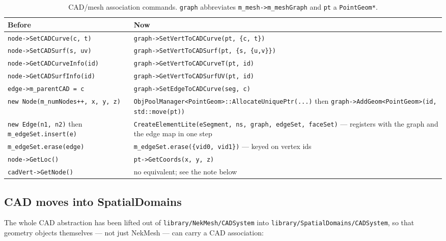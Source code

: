 \begin{table}[h!]
  \centering
  \small
  \begin{tabular}{p{}p{}}
    \hline
    \textbf{Before} & \textbf{Now}\\
    \hline
    \texttt{node->SetCADCurve(c, t)} &
    \texttt{graph->SetVertToCADCurve(pt, \{c, t\})}\\
    \hline
    \texttt{node->SetCADSurf(s, uv)} &
    \texttt{graph->SetVertToCADSurf(pt, \{s, \{u,v\}\})}\\
    \hline
    \texttt{node->GetCADCurveInfo(id)} &
    \texttt{graph->GetVertToCADCurveT(pt, id)}\\
    \hline
    \texttt{node->GetCADSurfInfo(id)} &
    \texttt{graph->GetVertToCADSurfUV(pt, id)}\\
    \hline
    \texttt{edge->m\_parentCAD = c} &
    \texttt{graph->SetEdgeToCADCurve(seg, c)}\\
    \hline
    \texttt{new Node(m\_numNodes++, x, y, z)} &
    \texttt{ObjPoolManager<PointGeom>::AllocateUniquePtr(...)} then
    \texttt{graph->AddGeom<PointGeom>(id, std::move(pt))}\\
    \hline
    \texttt{new Edge(n1, n2)} then
    \texttt{m\_edgeSet.insert(e)} &
    \texttt{CreateElementLite(eSegment, ns, graph, edgeSet, faceSet)}
    --- registers with the graph and the edge map in one step\\
    \hline
    \texttt{m\_edgeSet.erase(edge)} &
    \texttt{m\_edgeSet.erase(\{vid0, vid1\})} --- keyed on vertex ids\\
    \hline
    \texttt{node->GetLoc()} &
    \texttt{pt->GetCoords(x, y, z)}\\
    \hline
    \texttt{cadVert->GetNode()} &
    no equivalent; see the note below\\
    \hline
  \end{tabular}
  \caption{CAD/mesh association commands. \texttt{graph} abbreviates
    \texttt{m\_mesh->m\_meshGraph} and \texttt{pt} a
    \texttt{PointGeom*}.}
  \label{tab:ops_cadlink}
\end{table}



\subsection{CAD moves into SpatialDomains}
The whole CAD abstraction has been lifted out of
\texttt{library/NekMesh/CADSystem} into
\texttt{library/SpatialDomains/CADSystem}, so that geometry objects
themselves --- not just NekMesh --- can carry a CAD association:

